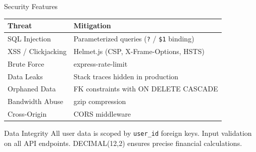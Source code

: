 \documentclass[aspectratio=169, 12pt]{beamer}
\begin{document}
\begin{frame}{Security Features}

\begin{center}
\begin{tabular}{l l}
\toprule
\textbf{Threat} & \textbf{Mitigation} \\
\midrule
SQL Injection & Parameterized queries (\texttt{?} / \texttt{\$1} binding) \\
XSS / Clickjacking & Helmet.js (CSP, X-Frame-Options, HSTS) \\
Brute Force & express-rate-limit \\
Data Leaks & Stack traces hidden in production \\
Orphaned Data & FK constraints with ON DELETE CASCADE \\
Bandwidth Abuse & gzip compression \\
Cross-Origin & CORS middleware \\
\bottomrule
\end{tabular}
\end{center}

\vspace{8pt}
\begin{block}{Data Integrity}
All user data is scoped by \texttt{user\_id} foreign keys. Input validation on all API endpoints. DECIMAL(12,2) ensures precise financial calculations.
\end{block}
\end{frame}
\end{document}
